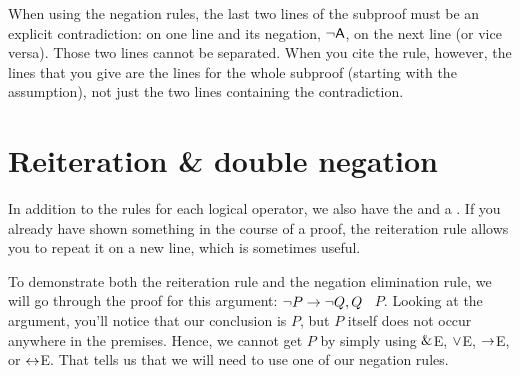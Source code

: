When using the negation rules, the last two lines of the subproof must be an explicit contradiction:  on one line and its negation, ${\neg}\mathsf{A}$, on the next line (or vice versa). Those two lines cannot be separated. When you cite the rule, however, the lines that you give are the lines for the whole subproof (starting with the assumption), not just the two lines containing the contradiction. 



\section{Reiteration \& double negation}
In addition to the rules for each logical operator, we also have the  and a . If you already have shown something in the course of a proof, the reiteration rule allows you to repeat it on a new line, which is sometimes useful.  


To demonstrate both the reiteration rule and the negation elimination rule, we will go through the proof for this argument: ${\neg} P \rightarrow {\neg} Q, Q$ \therefore\ $P$. Looking at the argument, you'll notice that our conclusion is $P$, but $P$ itself does not occur anywhere in the premises. Hence, we cannot get $P$ by simply using $\mathbin{\&}$E, $\vee$E, $\rightarrow$E, or $\leftrightarrow$E. That tells us that we will need to use one of our negation rules.

